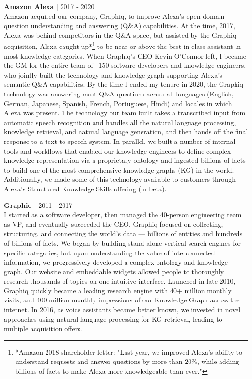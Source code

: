 \documentclass[a4paper,10pt]{article}
\begin{document}
\noindent
\textbf{Amazon Alexa} | 2017 - 2020 \\
Amazon acquired our company, Graphiq, to improve Alexa's open domain question understanding and answering (Q\&A) capabilities. At the time, 2017, Alexa was behind competitors in the Q\&A space, but assisted by the Graphiq acquisition, Alexa caught up*\footnote{*Amazon 2018 shareholder letter: "Last year, we improved Alexa’s ability to understand requests and answer questions by more than 20\%, while adding billions of facts to make Alexa more knowledgeable than ever."}  to be near or above the best-in-class assistant in most knowledge categories. When Graphiq's CEO Kevin O'Connor left, I became the GM for the entire team of ~150 software developers and knowledge engineers, who jointly built the technology and knowledge graph supporting Alexa's semantic Q\&A capabilities. By the time I ended my tenure in 2020, the Graphiq technology was answering most Q\&A questions across all languages (English, German, Japanese, Spanish, French, Portuguese, Hindi) and locales in which Alexa was present. The technology our team built takes a transcribed input from automatic speech recognition and handles all the natural language processing, knowledge retrieval, and natural language generation, and then hands off the final response to a text to speech system. In parallel, we built a number of internal tools and workflows that enabled our knowledge engineers to define complex knowledge representation via a proprietary ontology and ingested billions of facts to build one of the most comprehensive knowledge graphs (KG) in the world. Additionally, we made some of this technology available to customers through Alexa's Structured Knowledge Skills offering (in beta).

\vspace{5pt} %

\noindent
\textbf{Graphiq} | 2011 - 2017 \\
I started as a software developer, then managed the 40-person engineering team as VP, and eventually succeeded the CEO. Graphiq focused on collecting, structuring, and connecting the world’s data — billions of entities and hundreds of billions of facts. We began by building stand-alone vertical search engines for specific categories, but upon understanding the value of interconnected information, we progressively developed a complex ontology and knowledge graph. Our website and embeddable widgets allowed people to thoroughly research thousands of topics on one intuitive interface. Launched in late 2010, Graphiq quickly became a leading research engine with 40+ million monthly visits, and 400 million monthly impressions of our Knowledge Graph across the internet. In 2016, as voice assistants became better known, we invested in novel approaches using natural language processing for KG retrieval, leading to multiple acquisition offers.
\end{document}
